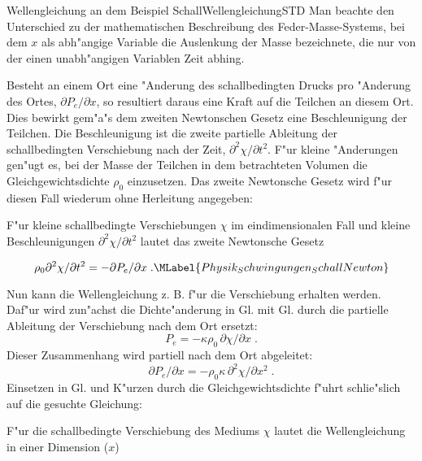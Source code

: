 \begin{MXContent}{Wellengleichung an dem Beispiel Schall}{Wellengleichung}{STD}
Man beachte den Unterschied zu der mathematischen Beschreibung des Feder-Masse-Systems, bei dem $x$ als abh"angige Variable die Auslenkung der Masse bezeichnete, die nur von der einen unabh"angigen Variablen Zeit abhing.

Besteht an einem Ort eine "Anderung des schallbedingten Drucks pro "Anderung des Ortes, $\partial P_e / \partial x$, so resultiert daraus eine Kraft auf die Teilchen an diesem Ort. Dies bewirkt gem"a"s dem zweiten Newtonschen Gesetz eine Beschleunigung der Teilchen. Die Beschleunigung ist die zweite partielle Ableitung der schallbedingten Verschiebung nach der Zeit, $\partial^2 \chi / \partial t^2$. F"ur kleine "Anderungen gen"ugt es, bei der Masse der Teilchen in dem betrachteten Volumen die Gleichgewichtsdichte $\rho_0$ einzusetzen. Das zweite Newtonsche Gesetz wird f"ur diesen Fall wiederum ohne Herleitung angegeben:

\begin{MInfo}
F"ur kleine schallbedingte Verschiebungen $\chi$ im eindimensionalen Fall und kleine Beschleunigungen $\partial^2 \chi / \partial t^2$ lautet das zweite Newtonsche Gesetz

\begin{equation}
  \rho_0 \partial^2 \chi / \partial t^2 = -\partial P_e / \partial x\; .\MLabel{Physik_Schwingungen_SchallNewton}
\end{equation}

\end{MInfo}

Nun kann die Wellengleichung z. B. f"ur die Verschiebung erhalten werden. Daf"ur wird zun"achst die Dichte"anderung in Gl.  mit Gl.  durch die partielle Ableitung der Verschiebung nach dem Ort ersetzt:
\begin{equation}
  P_e = -\kappa \rho_0 \, \partial \chi / \partial x\; .
\end{equation}
Dieser Zusammenhang wird partiell nach dem Ort abgeleitet:
\begin{equation}
  \partial P_e / \partial x = -\rho_0 \kappa \, \partial^2 \chi / \partial x^2\; .
\end{equation}
Einsetzen in Gl.  und K"urzen durch die Gleichgewichtsdichte f"uhrt schlie"slich auf die gesuchte Gleichung:
\begin{MInfo}
F"ur die schallbedingte Verschiebung des Mediums $\chi$ lautet die Wellengleichung in einer Dimension ($x$)


\end{MInfo}
\end{MXContent}
